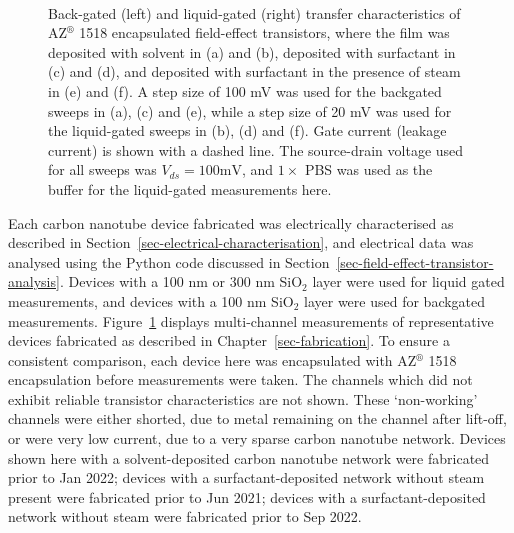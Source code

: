 \documentclass[
  a4paper,
]{scrbook}
\begin{document}
\begin{figure}
\begin{minipage}[t]{0.45\linewidth}
{{}

}

\end{minipage}%
%
\begin{minipage}[t]{0.01\linewidth}

{\centering 

~

}

\end{minipage}%

\caption{\label{fig-pristine-cnt-characteristics}Back-gated (left) and
liquid-gated (right) transfer characteristics of AZ\(^\circledR\) 1518
encapsulated field-effect transistors, where the film was deposited with
solvent in (a) and (b), deposited with surfactant in (c) and (d), and
deposited with surfactant in the presence of steam in (e) and (f). A
step size of 100 mV was used for the backgated sweeps in (a), (c) and
(e), while a step size of 20 mV was used for the liquid-gated sweeps in
(b), (d) and (f). Gate current (leakage current) is shown with a dashed
line. The source-drain voltage used for all sweeps was
\(V_{ds} = 100 \textrm{mV}\), and \(1 \times\) PBS was used as the
buffer for the liquid-gated measurements here.}

\end{figure}

Each carbon nanotube device fabricated was electrically characterised as
described in Section~\ref{sec-electrical-characterisation}, and
electrical data was analysed using the Python code discussed in
Section~\ref{sec-field-effect-transistor-analysis}. Devices with a 100
nm or 300 nm SiO\(_2\) layer were used for liquid gated measurements,
and devices with a 100 nm SiO\(_2\) layer were used for backgated
measurements. Figure~\ref{fig-pristine-cnt-characteristics} displays
multi-channel measurements of representative devices fabricated as
described in Chapter~\ref{sec-fabrication}. To ensure a consistent
comparison, each device here was encapsulated with AZ\(^\circledR\) 1518
encapsulation before measurements were taken. The channels which did not
exhibit reliable transistor characteristics are not shown. These
`non-working' channels were either shorted, due to metal remaining on
the channel after lift-off, or were very low current, due to a very
sparse carbon nanotube network. Devices shown here with a
solvent-deposited carbon nanotube network were fabricated prior to Jan
2022; devices with a surfactant-deposited network without steam present
were fabricated prior to Jun 2021; devices with a surfactant-deposited
network without steam were fabricated prior to Sep 2022.
\end{document}
